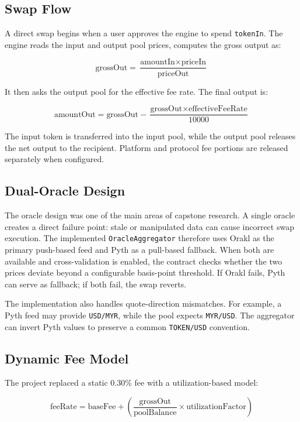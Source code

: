 \documentclass{article}
\begin{document}
\subsection{Swap Flow}

A direct swap begins when a user approves the engine to spend \texttt{tokenIn}. The engine reads the input and output pool prices, computes the gross output as:

\[
\text{grossOut} = \frac{\text{amountIn} \times \text{priceIn}}{\text{priceOut}}
\]

It then asks the output pool for the effective fee rate. The final output is:

\[
\text{amountOut} = \text{grossOut} - \frac{\text{grossOut} \times \text{effectiveFeeRate}}{10000}
\]

The input token is transferred into the input pool, while the output pool releases the net output to the recipient. Platform and protocol fee portions are released separately when configured.

\subsection{Dual-Oracle Design}

The oracle design was one of the main areas of capstone research. A single oracle creates a direct failure point: stale or manipulated data can cause incorrect swap execution. The implemented \texttt{OracleAggregator} therefore uses Orakl as the primary push-based feed and Pyth as a pull-based fallback. When both are available and cross-validation is enabled, the contract checks whether the two prices deviate beyond a configurable basis-point threshold. If Orakl fails, Pyth can serve as fallback; if both fail, the swap reverts.

The implementation also handles quote-direction mismatches. For example, a Pyth feed may provide \texttt{USD/MYR}, while the pool expects \texttt{MYR/USD}. The aggregator can invert Pyth values to preserve a common \texttt{TOKEN/USD} convention.

\subsection{Dynamic Fee Model}

The project replaced a static 0.30\% fee with a utilization-based model:

\[
\text{feeRate} = \text{baseFee} + \left(\frac{\text{grossOut}}{\text{poolBalance}} \times \text{utilizationFactor}\right)
\]
\end{document}
